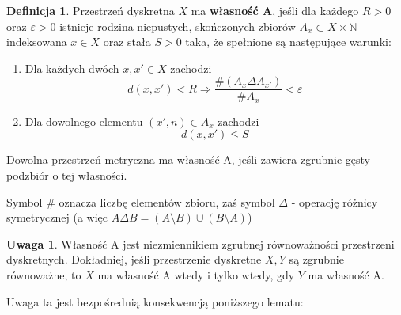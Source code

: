 \documentclass[licencjacka]{pracamgr}
\theoremstyle{definition}
\newtheorem{definition}{Definicja}[section]
\theoremstyle{definition}
\newtheorem{remark}{Uwaga}[section]
\theoremstyle{definition}
\theoremstyle{definition}
\theoremstyle{definition}
\theoremstyle{plain}
\theoremstyle{plain}
\begin{document}
\begin{definition}
	Przestrzeń dyskretna $ X $ ma \textbf{własność A}, jeśli dla każdego $ R>0 $ oraz 
	$ \varepsilon > 0 $ istnieje rodzina niepustych, skończonych zbiorów $ A_x \subset 
	X \times \mathbb{N} $ indeksowana $ x \in X $ oraz stała $ S > 0 $ taka, że 
	spełnione są następujące warunki:
	\begin{enumerate}
		\item Dla każdych dwóch $ x,x' \in X $ zachodzi
		$$ d(x,x') < R \Rightarrow \frac{\# (A_x \Delta A_{x'})}{\# A_x} < \varepsilon$$
		\item Dla dowolnego elementu $(x', n) \in A_x$ zachodzi $$ d(x,x') \leq S $$
	\end{enumerate}
	Dowolna przestrzeń metryczna ma własność A, jeśli zawiera zgrubnie gęsty podzbiór 
	o tej własności.
\end{definition}
Symbol $ \# $ oznacza liczbę elementów zbioru, zaś symbol $ \Delta $ - operację 
różnicy symetrycznej (a więc $A \Delta B = (A \setminus B) \cup (B \setminus A)$)


\begin{remark}
	Własność A jest niezmiennikiem zgrubnej równoważności przestrzeni dyskretnych. 
	Dokładniej, jeśli przestrzenie dyskretne $ X,Y $ są zgrubnie równoważne, to 
	$ X $ ma własność A wtedy i tylko wtedy, gdy $ Y $ ma własność A.
\end{remark}

Uwaga ta jest bezpośrednią konsekwencją poniższego lematu:
\end{document}
